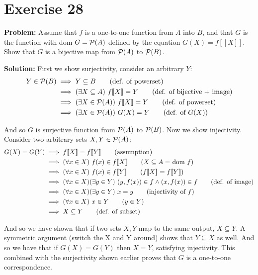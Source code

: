 \documentclass{article}
\begin{document}
\section*{Exercise 28}
\noindent\textbf{Problem:} Assume that $f$ is a one-to-one function from $A$ into $B$, and that $G$ is the function with dom $G=\mathcal P(A)$ defined by the equation $G(X)=f[\![X]\!]$. Show that $G$ is a bijective map from $\mathcal P(A)$ to $\mathcal P(B)$.
\bigskip

\noindent\textbf{Solution:} First we show surjectivity, consider an arbitrary $Y$:
\begin{align*}
    Y\in \mathcal P(B)&\implies Y\subseteq B\tag{def. of powerset}\\
    &\implies (\exists X\subseteq A)\,\,f[\![X]\!]=Y\tag{def. of bijective + image}\\
    &\implies (\exists X\in\mathcal P(A))\,\,f[\![X]\!]=Y\tag{def. of powerset}\\
    &\implies (\exists X\in\mathcal P(A))\,\,G(X)=Y\tag{def. of $G(X)$}
\end{align*}


And so $G$ is surjective function from $\mathcal P(A)$ to $\mathcal P(B)$. Now we show injectivity. Consider two arbitrary sets $X,Y\in\mathcal P(A)$:
\begin{align*}
    G(X)=G(Y)&\implies f[\![X]\!]=f[\![Y]\!]\tag{assumption}\\
    &\implies (\forall x\in X)\,\,f(x)\in f[\![X]\!]\tag{$X\subseteq A=$ dom $f$}\\
    &\implies (\forall x\in X)\,\,f(x)\in f[\![Y]\!]\tag{$f[\![X]\!]=f[\![Y]\!]$}\\
    &\implies (\forall x\in X)(\exists y\in Y)\,\,\pair{y}{f(x)}\in f\wedge \pair{x}{f(x)}\in f\tag{def. of image}\\
    &\implies (\forall x\in X)(\exists y\in Y)\,\,x=y\tag{injectivity of $f$}\\
    &\implies (\forall x\in X)\,\,x\in Y\tag{$y\in Y$}\\
    &\implies X\subseteq Y\tag{def. of subset}\\
\end{align*}

And so we have shown that if two sets $X,Y$ map to the same output, $X\subseteq Y$. A symmetric argument (switch the X and Y around) shows that $Y\subseteq X$ as well. And so we have that if $G(X)=G(Y)$ then $X=Y$, satisfying injectivity. This combined with the surjectivity shown earlier proves that $G$ is a one-to-one correspondence.
\end{document}
